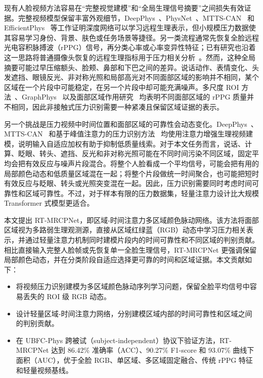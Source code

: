 \documentclass[runningheads]{llncs}
\begin{document}
现有人脸视频方法容易在“完整视觉建模”和“全局生理信号摘要”之间损失有效证据。完整视频模型保留丰富外观细节，DeepPhys~\cite{chen2018deepphys}、PhysNet~\cite{yu2019physnet}、MTTS-CAN~\cite{liu2020mttscan} 和 EfficientPhys~\cite{liu2023efficientphys} 等工作证明深度网络可以学习远程生理表示，但小规模压力数据使其容易学习身份、背景、肤色或任务场景等捷径。另一类流程通常先恢复全脸远程光电容积脉搏波（rPPG）信号，再分类心率或心率变异性特征；已有研究也沿着这一思路将普通摄像头恢复的远程生理指标用于压力相关分析~\cite{mcduff2014remote,nikolaiev2020noncontact}。然而，这种全局摘要可能过早压缩额头、脸颊、鼻部和下巴之间的差异。说话动作、表情变化、头发遮挡、眼镜反光、非对称光照和局部高光对不同面部区域的影响并不相同，某个区域在一个片段中可能稳定，在另一个片段中却可能充满噪声。多尺度 ROI 方法~\cite{zhao2020multiscale}、GraphPhys~\cite{xiong2023graphphys} 以及面部区域作用研究~\cite{bondarenko2025regions} 均表明不同面部区域的 rPPG 质量并不相同，因此非接触式压力识别需要一种紧凑且保留区域证据的表示。

另一个挑战是压力视频中时间位置和面部区域的可靠性会动态变化。DeepPhys~\cite{chen2018deepphys}、MTTS-CAN~\cite{liu2020mttscan} 和基于峰值注意力的压力识别方法~\cite{xu2024mtasr} 均使用注意力增强生理视频建模，说明输入自适应加权有助于抑制低质量线索。对于本文任务而言，说话、计算、眨眼、转头、遮挡、反光和非对称光照可能在不同时间污染不同区域，固定平均会把有效反应与噪声片段混合。将整个人脸看成一个平均信号，可能会把有用的局部颜色动态和低质量区域混在一起；将整个片段做统一时间聚合，也可能把短时有效反应与眨眼、转头或光照突变混在一起。因此，压力识别需要同时考虑时间可靠性和区域可靠性。不过，对于样本有限的压力数据集，轻量注意力设计比大规模 Transformer 式模型更适合。

本文提出 RT-MRCPNet，即区域-时间注意力多区域颜色脉动网络。该方法将面部区域视为多路弱生理观测源，直接从区域红绿蓝（RGB）动态中学习压力相关表示，并通过轻量注意力机制同时建模片段内的时间可靠性和不同区域的判别贡献。相比直接输入完整人脸帧或先恢复单一全脸生理信号，RT-MRCPNet 更强调保留局部颜色动态，并在分类阶段自适应选择更可靠的时间和区域证据。本文贡献如下：
\begin{itemize}
    \item 将视频压力识别建模为多区域颜色脉动序列学习问题，保留全脸平均信号中容易丢失的 ROI 级 RGB 动态。
    \item 设计轻量区域-时间注意力网络，分别建模区域内部的时间可靠性和区域之间的判别贡献。
    \item 在 UBFC-Phys 跨被试（subject-independent）协议下验证方法，RT-MRCPNet 达到 86.42\% 准确率（ACC）、90.27\% F1-score 和 93.07\% 曲线下面积（AUC），优于全脸 RGB、单区域、多区域固定融合、传统 rPPG 特征和轻量视频基线。
\end{itemize}
\end{document}
